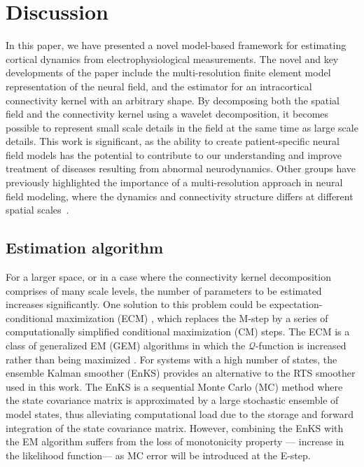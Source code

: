 \documentclass[review,authoryear,3p]{elsarticle}
\begin{document}
\section{Discussion}
In this paper, we have presented a novel model-based framework for estimating cortical dynamics from electrophysiological measurements. The novel and key developments of the paper include the multi-resolution finite element model representation of the neural field, and the estimator for an intracortical connectivity kernel with an arbitrary shape. By decomposing both the spatial field and the connectivity kernel using a wavelet decomposition, it becomes possible to represent small scale details in the field at the same time as large scale details. This work is significant, as the ability to create patient-specific neural field models has the potential to contribute to our understanding and improve treatment of diseases resulting from abnormal neurodynamics. Other groups have previously highlighted the importance of a multi-resolution approach in neural field modeling, where the dynamics and connectivity structure differs at different spatial scales~\citep{Jirsa2002,Jirsa2004,Breakspear2005,Qubbaj2009,Schultze-Kraft2011}. 
\subsection{Estimation algorithm}
For a larger space, or in a case where the connectivity kernel decomposition comprises of  many scale levels, the number of parameters to be estimated increases significantly. One solution to this problem could be expectation-conditional maximization (ECM) \citep{Meng1993,Meng1994}, which replaces the M-step by a series of computationally simplified conditional maximization (CM) steps. The ECM is a class of generalized EM (GEM)  algorithms in which the $\mathcal{Q}$-function is increased rather than being maximized \citep{Fessler1994}. For systems with a high number of states, the ensemble Kalman smoother (EnKS) \citep{Evensen2003,Evensen2009a,Evensen2009} provides an alternative to the RTS smoother used in this work. The EnKS is a sequential Monte Carlo (MC) method where the state covariance matrix is approximated by a large stochastic ensemble of model states, thus alleviating computational load due to the storage and forward integration of the state covariance matrix. However, combining the EnKS with the EM algorithm suffers from the loss of monotonicity property --- increase in the likelihood function--- as MC error will be introduced at the E-step.
\end{document}
